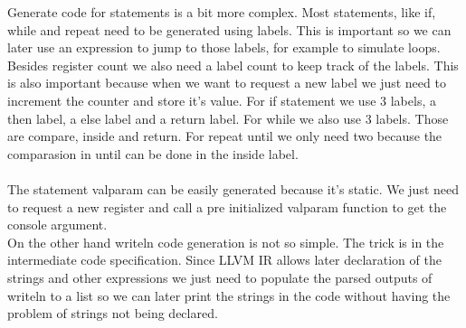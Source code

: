 \documentclass[12pt]{article}
\begin{document}
Generate code for statements is a bit more complex. Most statements, like if, while and repeat need to be generated using labels. This is important so we can later use an expression to jump to those labels, for example to simulate loops. \\ 
Besides register count we also need a label count to keep track of the labels. This is also important because when we want to request a new label we just need to increment the counter and store it's value. For if statement we use 3 labels, a then label, a else label and a return label. For while we also use 3 labels. Those are compare, inside and return. For repeat until we only need two because the comparasion in until can be done in the inside label. \\ \\ 
The statement valparam can be easily generated because it's static. We just need to request a new register and call a pre initialized valparam function to get the console argument. \\
On the other hand writeln code generation is not so simple. The trick is in the intermediate code specification. Since LLVM IR allows later declaration of the strings and other expressions we just need to populate the parsed outputs of writeln to a list so we can later print the strings in the code without having the problem of strings not being declared. \\
\end{document}
